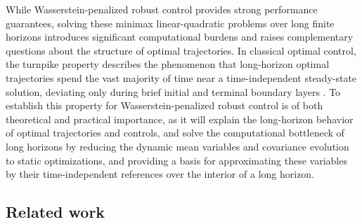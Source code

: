 \documentclass[10pt,journal,twoside]{IEEEtran}
\theoremstyle{definition}
\theoremstyle{remark}
\begin{document}
While Wasserstein-penalized robust control provides strong performance guarantees, solving these minimax linear-quadratic problems over long finite horizons introduces significant computational burdens and raises complementary questions about the structure of optimal trajectories. In classical optimal control, the turnpike property describes the phenomenon that long-horizon optimal trajectories spend the vast majority of time near a time-independent steady-state solution, deviating only during brief initial and terminal boundary layers
\cite{Grune2013,TrelatZuazua2015,TrelatZhangZuazua2018}. To establish this property for Wasserstein-penalized robust
control is of both theoretical and practical importance, as it will explain the long-horizon behavior of optimal trajectories and controls, and solve the computational bottleneck of long horizons by reducing the dynamic mean variables and covariance evolution to static optimizations, and providing a basis for approximating these variables by their time-independent references over the interior of a long horizon.

\subsection{Related work}
\end{document}

